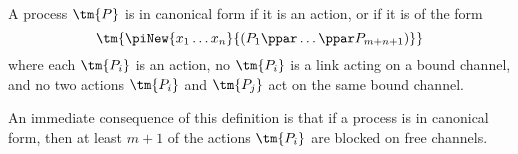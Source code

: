 \begin{definition}\label{def:hccp-canonical-forms}
  A process $\tm{P}$ is in canonical form if it is an action, or if it is of the
  form
  \[
    \tm{\piNew{x_1\dots x_n}{(P_1\ppar\dots\ppar P_{m+n+1})}}
  \]
  where each $\tm{P_i}$ is an action, no $\tm{P_i}$ is a link acting on a bound
  channel, and no two actions $\tm{P_i}$ and $\tm{P_j}$ act on the same bound
  channel.

  An immediate consequence of this definition is that if a process is in
  canonical form, then at least $m+1$ of the actions $\tm{P_i}$ are blocked on
  free channels.
\end{definition}
